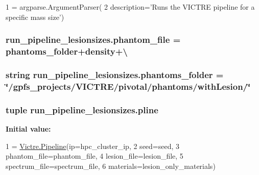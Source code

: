 \begin{DoxyCode}
1 = argparse.ArgumentParser(
2     description=\textcolor{stringliteral}{'Runs the VICTRE pipeline for a specific mass size'})
\end{DoxyCode}
\hypertarget{namespacerun__pipeline__lesionsizes_aa31734859d313f521c7643f1db6be86c}{
\subsubsection[{phantom\-\_\-file}]{\setlength{\rightskip}{0pt plus 5cm}run\-\_\-pipeline\-\_\-lesionsizes.\-phantom\-\_\-file = {\bf phantoms\-\_\-folder}+{\bf density}+\textbackslash{}}}\label{namespacerun__pipeline__lesionsizes_aa31734859d313f521c7643f1db6be86c}
\hypertarget{namespacerun__pipeline__lesionsizes_a121e580b0ae55595847533bd0f4c9250}{
\subsubsection[{phantoms\-\_\-folder}]{\setlength{\rightskip}{0pt plus 5cm}string run\-\_\-pipeline\-\_\-lesionsizes.\-phantoms\-\_\-folder = \char`\"{}/gpfs\-\_\-projects/V\-I\-C\-T\-R\-E/pivotal/phantoms/with\-Lesion/\char`\"{}}}\label{namespacerun__pipeline__lesionsizes_a121e580b0ae55595847533bd0f4c9250}
\hypertarget{namespacerun__pipeline__lesionsizes_ac13a2bd6cea7d4d8155376ddaf1ba751}{
\subsubsection[{pline}]{\setlength{\rightskip}{0pt plus 5cm}tuple run\-\_\-pipeline\-\_\-lesionsizes.\-pline}}\label{namespacerun__pipeline__lesionsizes_ac13a2bd6cea7d4d8155376ddaf1ba751}
{\bfseries Initial value\-:}
\begin{DoxyCode}
1 = \hyperlink{namespaceVictre_1_1Pipeline}{Victre.Pipeline}(ip=hpc\_cluster\_ip,
2                             seed=seed,
3                             phantom\_file=phantom\_file,
4                             lesion\_file=lesion\_file,
5                             spectrum\_file=spectrum\_file,
6                             materials=lesion\_only\_materials)
\end{DoxyCode}
